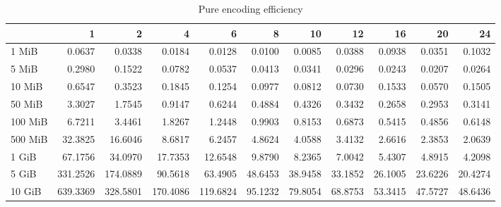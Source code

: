 \begin{table}[!h]
	\caption{Pure encoding efficiency}
\begin{tabular}{lrrrrrrrrrr}
	\toprule
	\diagbox{File sizes }{Threads}  &        1  &        2  &        4  &        6  &       8  &       10 &       12 &       16 &       20 &       24 \\
	\midrule
	1 MiB   &    0.0637 &    0.0338 &    0.0184 &    0.0128 &   0.0100 &   0.0085 &   0.0388 &   0.0938 &   0.0351 &   0.1032 \\
	5 MiB   &    0.2980 &    0.1522 &    0.0782 &    0.0537 &   0.0413 &   0.0341 &   0.0296 &   0.0243 &   0.0207 &   0.0264 \\
	10 MiB  &    0.6547 &    0.3523 &    0.1845 &    0.1254 &   0.0977 &   0.0812 &   0.0730 &   0.1533 &   0.0570 &   0.1505 \\
	50 MiB  &    3.3027 &    1.7545 &    0.9147 &    0.6244 &   0.4884 &   0.4326 &   0.3432 &   0.2658 &   0.2953 &   0.3141 \\
	100 MiB &    6.7211 &    3.4461 &    1.8267 &    1.2448 &   0.9903 &   0.8153 &   0.6873 &   0.5415 &   0.4856 &   0.6148 \\
	500 MiB &   32.3825 &   16.6046 &    8.6817 &    6.2457 &   4.8624 &   4.0588 &   3.4132 &   2.6616 &   2.3853 &   2.0639 \\
	1 GiB   &   67.1756 &   34.0970 &   17.7353 &   12.6548 &   9.8790 &   8.2365 &   7.0042 &   5.4307 &   4.8915 &   4.2098 \\
	5 GiB   &  331.2526 &  174.0889 &   90.5618 &   63.4905 &  48.6453 &  38.9458 &  33.1852 &  26.1005 &  23.6226 &  20.4274 \\
	10 GiB  &  639.3369 &  328.5801 &  170.4086 &  119.6824 &  95.1232 &  79.8054 &  68.8753 &  53.3415 &  47.5727 &  48.6436 \\
	\bottomrule
\end{tabular}
\end{table}
